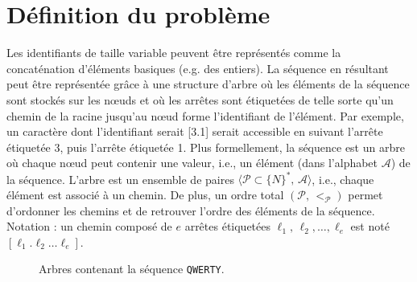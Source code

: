 
\section{Définition du problème}


Les identifiants de taille variable peuvent être représentés comme la
concaténation d'éléments basiques (e.g. des entiers). La séquence en résultant
peut être représentée grâce à une structure d'arbre où les éléments de la
séquence sont stockés sur les nœuds et où les arrêtes sont étiquetées de telle
sorte qu'un chemin de la racine jusqu'au nœud forme l'identifiant de
l'élément. Par exemple, un caractère dont l'identifiant serait [3.1] serait
accessible en suivant l'arrête étiquetée 3, puis l'arrête étiquetée 1. Plus
formellement, la séquence est un arbre où chaque nœud peut contenir une valeur,
i.e., un élément (dans l'alphabet $\mathcal{A}$) de la séquence. L'arbre est un
ensemble de paires $\langle \mathcal{P}\subset \{N\}^*,\, \mathcal{A} \rangle$,
i.e., chaque élément est associé à un chemin. De plus, un ordre total
$(\mathcal{P},\, <_\mathcal{P})$ permet d'ordonner les chemins et de retrouver
l'ordre des éléments de la séquence. Notation : un chemin composé de $e$ arrêtes
étiquetées $\ell_1,\,\ell_2,\ldots,\ell_e$ est noté
$[\ell_1.\ell_2\ldots\ell_e]$.

\begin{figure}
  \centering
  \hspace{20pt}
  \caption[Arbres contenant une séquence répliquée]
  {Arbres contenant la séquence \texttt{QWERTY}.}
\end{figure}

